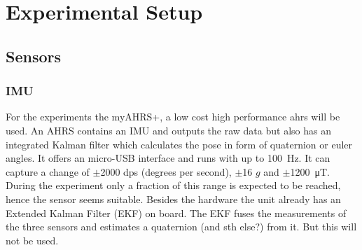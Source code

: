 \chapter{Experimental Setup}
\label{ch:ExperimentalSetup}

\section{Sensors}
\subsection{IMU}
For the experiments the myAHRS+, a low cost high performance \gls{ahrs} will be used.
An AHRS contains an IMU and outputs the raw data but also has an integrated Kalman filter which calculates the pose in form of quaternion or euler angles.
It offers an micro-USB interface and runs with up to \SI{100}{\Hz}.
It can capture a change of $\pm$2000 dps (degrees per second), $\pm$16 $g$ and $\pm$\SI{1200}{\micro\tesla}.
During the experiment only a fraction of this range is expected to be reached, hence the sensor seems suitable.
Besides the hardware the unit already has an Extended Kalman Filter (EKF) on board.
The EKF fuses the measurements of the three sensors and estimates a quaternion (and sth else?) from it.
But this will not be used.


